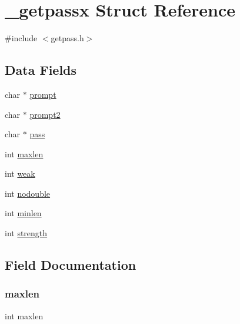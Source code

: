 \hypertarget{struct__getpassx}{}\section{\+\_\+getpassx Struct Reference}
\label{struct__getpassx}


{\ttfamily \#include $<$getpass.\+h$>$}

\subsection*{Data Fields}
\begin{DoxyCompactItemize}
\item 
char $\ast$ \hyperlink{struct__getpassx_a881961d263cfa8c42ca67419559b3c00}{prompt}
\item 
char $\ast$ \hyperlink{struct__getpassx_ac811868441df47ffc5a798a9f7dfec8d}{prompt2}
\item 
char $\ast$ \hyperlink{struct__getpassx_a543ce0d7b42f492162d73ad4880d58c4}{pass}
\item 
int \hyperlink{struct__getpassx_a245b5bee0d02a20222d815dbeaaac0fb}{maxlen}
\item 
int \hyperlink{struct__getpassx_aaa1d7b9bbcc089f15892f72f2526175e}{weak}
\item 
int \hyperlink{struct__getpassx_a1ddc274a4037b9f974d38e874c620b58}{nodouble}
\item 
int \hyperlink{struct__getpassx_a63bd8aad0471d117b8a53a9c407855d7}{minlen}
\item 
int \hyperlink{struct__getpassx_af0114dc9171a9bdc183e54e510bd861d}{strength}
\end{DoxyCompactItemize}


\subsection{Field Documentation}
\mbox{\label{struct__getpassx_a245b5bee0d02a20222d815dbeaaac0fb}} 
\subsubsection{\texorpdfstring{maxlen}{maxlen}}
{\footnotesize\ttfamily int maxlen}

\mbox{\label{struct__getpassx_a63bd8aad0471d117b8a53a9c407855d7}} 
